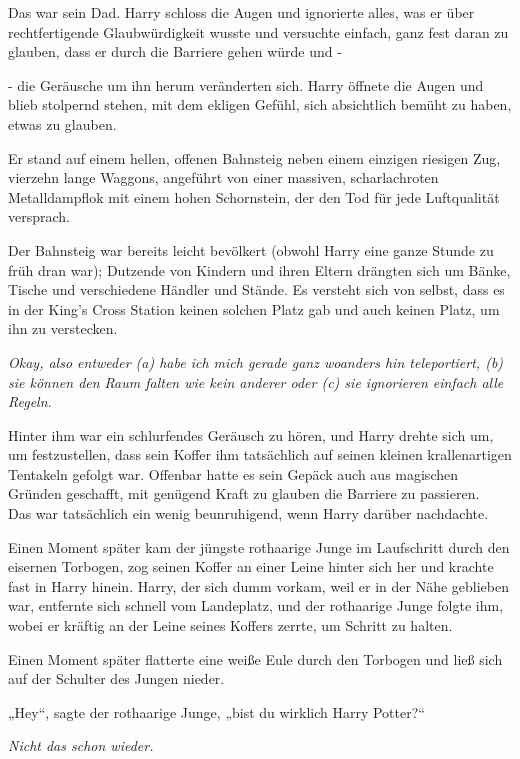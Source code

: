 {Das war sein Dad. Harry schloss die Augen und ignorierte alles, was er über\\ rechtfertigende Glaubwürdigkeit wusste und versuchte einfach, ganz fest daran zu glauben, dass er durch die Barriere gehen würde und -

- die Geräusche um ihn herum veränderten sich. Harry öffnete die Augen und blieb stolpernd stehen, mit dem ekligen Gefühl, sich absichtlich bemüht zu haben, etwas zu glauben.

Er stand auf einem hellen, offenen Bahnsteig neben einem einzigen riesigen Zug, vierzehn lange Waggons, angeführt von einer massiven, scharlachroten Metalldampflok mit einem hohen Schornstein, der den Tod für jede Luftqualität versprach.

Der Bahnsteig war bereits leicht bevölkert (obwohl Harry eine ganze Stunde zu früh dran war); Dutzende von Kindern und ihren Eltern drängten sich um Bänke, Tische und verschiedene Händler und Stände. Es versteht sich von selbst, dass es in der King's Cross Station keinen solchen Platz gab und auch keinen Platz, um ihn zu verstecken.

\emph{Okay, also entweder (a) habe ich mich gerade ganz woanders hin teleportiert, (b) sie können den Raum falten wie kein anderer oder (c) sie ignorieren einfach alle Regeln.}

Hinter ihm war ein schlurfendes Geräusch zu hören, und Harry drehte sich um, um festzustellen, dass sein Koffer ihm tatsächlich auf seinen kleinen krallenartigen Tentakeln gefolgt war. Offenbar hatte es sein Gepäck auch aus magischen Gründen geschafft, mit genügend Kraft zu glauben die Barriere zu passieren.\\ Das war tatsächlich ein wenig beunruhigend, wenn Harry darüber nachdachte.

Einen Moment später kam der jüngste rothaarige Junge im Laufschritt durch den eisernen Torbogen, zog seinen Koffer an einer Leine hinter sich her und krachte fast in Harry hinein. Harry, der sich dumm vorkam, weil er in der Nähe geblieben war, entfernte sich schnell vom Landeplatz, und der rothaarige Junge folgte ihm, wobei er kräftig an der Leine seines Koffers zerrte, um Schritt zu halten.

Einen Moment später flatterte eine weiße Eule durch den Torbogen und ließ sich auf der Schulter des Jungen nieder.

„Hey“, sagte der rothaarige Junge, „bist du wirklich Harry Potter?“

\emph{Nicht das schon wieder.}

}
